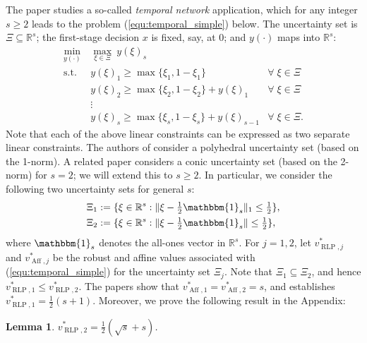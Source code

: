 \documentclass[12pt]{article}
\DeclareMathOperator{\st}{s.t.}
\DeclareMathOperator{\AR}{RLP}
\DeclareMathOperator{\AP}{Aff}
\newtheorem{lemma}{Lemma}
\def\RR{{\mathbb{R}}}
\begin{document}
\begin{onehalfspace}
The paper \cite{Wiesemann.Kuhn.Rustem.2011} studies a so-called {\em
temporal network\/} application, which for any integer $s \ge 2$ leads
to the problem (\ref{equ:temporal_simple}) below. The uncertainty set is
$\Xi \subseteq \RR^s$; the first-stage decision $x$ is fixed, say, at 0;
and $y(\cdot)$ maps into $\RR^s$:
%
\begin{equation} \label{equ:temporal_simple}
\begin{array}{llll}
\min \limits_{y(\cdot)} \, & \max \limits_{\xi \in \Xi} \ y(\xi)_s \\
\st & y(\xi)_1 \ge \max\{\xi_1, 1 - \xi_1\}  & \forall \; \xi \in \Xi \\
    & y(\xi)_2 \ge \max\{\xi_2, 1 - \xi_2\} + y(\xi)_1 & \forall \; \xi \in \Xi \\
    &\vdots \\
    & y(\xi)_s \ge \max\{\xi_s, 1 - \xi_s\} + y(\xi)_{s-1} & \forall \; \xi \in \Xi.
\end{array}
\end{equation}
%
Note that each of the above linear constraints can be expressed
as two separate linear constraints. The authors of \cite{Wiesemann.Kuhn.Rustem.2011}
consider a polyhedral uncertainty set (based on the 1-norm). A related paper
\cite{Hadjiyiannis.Goulart.Kuhn.2011} considers a conic uncertainty set
(based on the 2-norm) for $s=2$; we will extend this to $s \ge 2$. In
particular, we consider the following two uncertainty sets for general
$s$:
%
\begin{align*}
    \Xi_1 &:= \{ \xi \in \RR^{s} : \|\xi - \tfrac12 \mathbbm{1}_s \|_1 \le \tfrac12 \}, \\
    \Xi_2 &:= \{ \xi \in \RR^{s} : \|\xi - \tfrac12 \mathbbm{1}_s \| \le \tfrac12 \},
\end{align*}
where $\mathbbm{1}_s$ denotes the all-ones vector in $\RR^s$. For $j =
1, 2$, let $v_{\AR, j}^*$ and $v^*_{\AP, j}$ be the robust and affine
values associated with (\ref{equ:temporal_simple}) for the uncertainty
set $\Xi_j$. Note that $\Xi_1 \subseteq \Xi_2$, and hence $v_{\AR, 1}^*
\le v_{\AR, 2}^*$. The papers \cite{Hadjiyiannis.Goulart.Kuhn.2011,
Wiesemann.Kuhn.Rustem.2011} show that $v_{\AP,1}^* = v_{\AP,2}^* =
s$, and \cite{Wiesemann.Kuhn.Rustem.2011} establishes $v_{\AR,1}^*
= \tfrac12(s + 1)$. Moreover, we prove the following result in the
Appendix:

\begin{lemma} \label{lemma:calculateVar2}
$v_{\AR, 2}^* = \tfrac12(\sqrt{s} + s)$. 
\end{lemma}


\end{onehalfspace}
\end{document}
